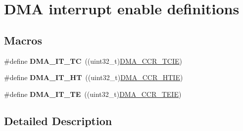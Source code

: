 \hypertarget{group___d_m_a__interrupt__enable__definitions}{\section{D\-M\-A interrupt enable definitions}
\label{group___d_m_a__interrupt__enable__definitions}
}
\subsection*{Macros}
\begin{DoxyCompactItemize}
\item 
\hypertarget{group___d_m_a__interrupt__enable__definitions_ga06e83dd277e0d3e5635cf8ce8dfd6e16}{\#define {\bfseries D\-M\-A\-\_\-\-I\-T\-\_\-\-T\-C}~((uint32\-\_\-t)\hyperlink{group___peripheral___registers___bits___definition_gaaba9cd82cab0cca23de038e946f81c6a}{D\-M\-A\-\_\-\-C\-C\-R\-\_\-\-T\-C\-I\-E})}\label{group___d_m_a__interrupt__enable__definitions_ga06e83dd277e0d3e5635cf8ce8dfd6e16}

\item 
\hypertarget{group___d_m_a__interrupt__enable__definitions_gadf11c572b9797e04a14b105fdc2e5f66}{\#define {\bfseries D\-M\-A\-\_\-\-I\-T\-\_\-\-H\-T}~((uint32\-\_\-t)\hyperlink{group___peripheral___registers___bits___definition_ga0f0fae31377ab1d33e36cead97b1811b}{D\-M\-A\-\_\-\-C\-C\-R\-\_\-\-H\-T\-I\-E})}\label{group___d_m_a__interrupt__enable__definitions_gadf11c572b9797e04a14b105fdc2e5f66}

\item 
\hypertarget{group___d_m_a__interrupt__enable__definitions_gaf9d92649d2a0146f663ff253d8f3b59e}{\#define {\bfseries D\-M\-A\-\_\-\-I\-T\-\_\-\-T\-E}~((uint32\-\_\-t)\hyperlink{group___peripheral___registers___bits___definition_ga3dd2204c9046500140e3c720fb5a415f}{D\-M\-A\-\_\-\-C\-C\-R\-\_\-\-T\-E\-I\-E})}\label{group___d_m_a__interrupt__enable__definitions_gaf9d92649d2a0146f663ff253d8f3b59e}

\end{DoxyCompactItemize}


\subsection{Detailed Description}

